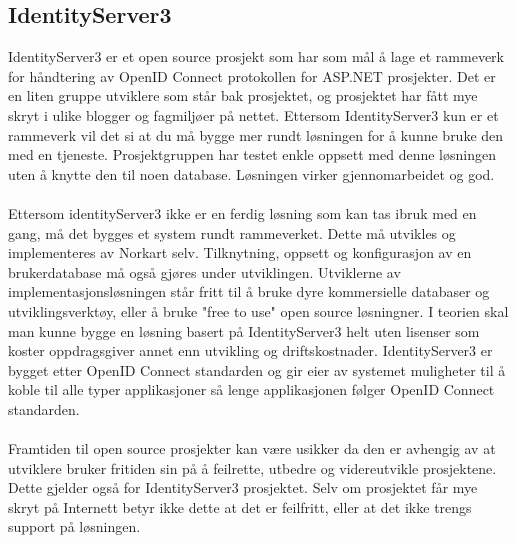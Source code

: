 \subsection*{IdentityServer3}
IdentityServer3 er et open source prosjekt som har som mål å lage et rammeverk for håndtering av OpenID Connect protokollen for ASP.NET prosjekter. Det er en liten gruppe utviklere som står bak prosjektet, og prosjektet har fått mye skryt i ulike blogger og fagmiljøer på nettet. Ettersom IdentityServer3 kun er et rammeverk vil det si at du må bygge mer rundt løsningen for å kunne bruke den med en tjeneste. Prosjektgruppen har testet enkle oppsett med denne løsningen uten å knytte den til noen database. Løsningen virker gjennomarbeidet og god. 
\\
\\
Ettersom identityServer3 ikke er en ferdig løsning som kan tas ibruk med en gang, må det bygges et system rundt rammeverket. Dette må utvikles og implementeres av Norkart selv. Tilknytning, oppsett og konfigurasjon av en brukerdatabase må også gjøres under utviklingen. Utviklerne av implementasjonsløsningen står fritt til å bruke dyre kommersielle databaser og utviklingsverktøy, eller å bruke "free to use" open source løsningner. I teorien skal man kunne bygge en løsning basert på IdentityServer3 helt uten lisenser som koster oppdragsgiver annet enn utvikling og driftskostnader. IdentityServer3 er bygget etter OpenID Connect standarden og gir eier av systemet muligheter til å koble til alle typer applikasjoner så lenge applikasjonen følger OpenID Connect standarden.
\\
\\
Framtiden til open source prosjekter kan være usikker da den er avhengig av at utviklere bruker fritiden sin på å feilrette, utbedre og videreutvikle prosjektene. Dette gjelder også for IdentityServer3 prosjektet. Selv om prosjektet får mye skryt på Internett betyr ikke dette at det er feilfritt, eller at det ikke trengs support på løsningen. 


